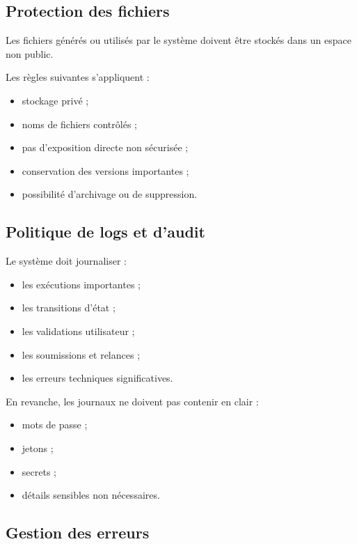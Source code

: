 \documentclass[11pt,a4paper]{article}
\begin{document}
\subsection{Protection des fichiers}

Les fichiers générés ou utilisés par le système doivent être stockés dans un espace non public.

Les règles suivantes s’appliquent :

\begin{itemize}
    \item stockage privé ;
    \item noms de fichiers contrôlés ;
    \item pas d’exposition directe non sécurisée ;
    \item conservation des versions importantes ;
    \item possibilité d’archivage ou de suppression.
\end{itemize}

\subsection{Politique de logs et d’audit}

Le système doit journaliser :

\begin{itemize}
    \item les exécutions importantes ;
    \item les transitions d’état ;
    \item les validations utilisateur ;
    \item les soumissions et relances ;
    \item les erreurs techniques significatives.
\end{itemize}

En revanche, les journaux ne doivent pas contenir en clair :

\begin{itemize}
    \item mots de passe ;
    \item jetons ;
    \item secrets ;
    \item détails sensibles non nécessaires.
\end{itemize}

\subsection{Gestion des erreurs}
\end{document}

